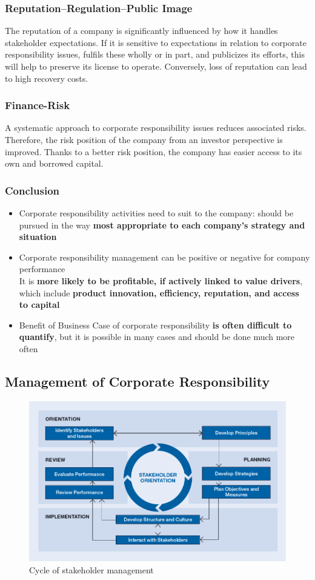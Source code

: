 \documentclass[11pt]{article}
\theoremstyle{definition}
\begin{document}
\subsubsection{Reputation–Regulation–Public Image}
The reputation of a company is significantly influenced by how it handles stakeholder expectations. If it is sensitive to expectations in relation to corporate responsibility issues, fulfils these wholly or in part, and publicizes its efforts, this will help to preserve its license to operate. Conversely, loss of reputation can lead to high recovery costs.

\subsubsection{Finance-Risk}
A systematic approach to corporate responsibility issues reduces associated risks. Therefore, the risk position of the company from an investor perspective is improved. Thanks to a better risk position, the company has easier access to its own and borrowed capital.

\subsubsection{Conclusion}
\begin{itemize}[label=-]
	\item Corporate responsibility activities need to suit to the company: should be pursued in the way \textbf{most appropriate to each company's strategy and situation}
	\item Corporate responsibility management can be positive or negative for company performance\\It is \textbf{more likely to be profitable, if actively linked to value drivers}, which include \textbf{product innovation, efficiency, reputation, and access to capital}
	\item Benefit of Business Case of corporate responsibility \textbf{is often difficult to quantify}, but it is possible in many cases and should be done much more often
\end{itemize}

\subsection{Management of Corporate Responsibility}
\begin{figure}[H]
	\centering
	\includegraphics[width=0.8\linewidth]{img/stakeholder_management}
	\caption{Cycle of stakeholder management}
	\label{fig:stakeholdermanagement}
\end{figure}
\end{document}
